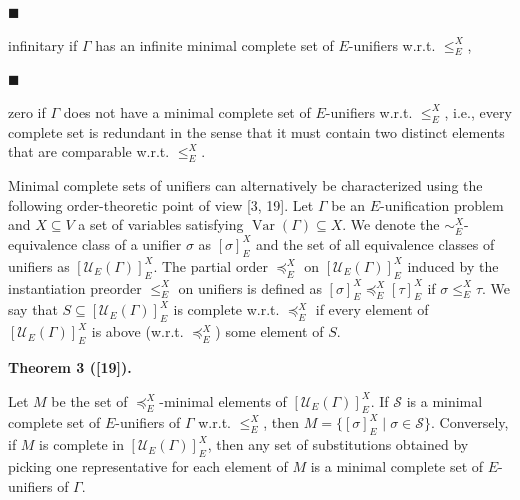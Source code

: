  
\par\noindent  $\blacksquare$ 
 
infinitary if $\Gamma$ has an infinite minimal complete set of $E$-unifiers w.r.t. $\leq_{E}^{X}$,\par
 
 
 
\par\noindent  $\blacksquare$ 
 
zero if $\Gamma$ does not have a minimal complete set of $E$-unifiers w.r.t. $\leq_{E}^{X}$, i.e., every complete set is redundant in the sense that it must contain two distinct elements that are comparable w.r.t. $\leq_{E}^{X}$.\par
 
 
  
 
 
 
Minimal complete sets of unifiers can alternatively be characterized using the following order-theoretic point of view [3, 19]. Let $\Gamma$ be an $E$-unification problem and $X\subseteq V$ a set of variables satisfying $\operatorname{Var}(\Gamma)\subseteq X$. We denote the $\sim_{E}^{X}$-equivalence class of a unifier $\sigma$ as $[\sigma]_{E}^{X}$ and the set of all equivalence classes of unifiers as $[\mathcal{U}_{E}(\Gamma)]_{E}^{X}$. The partial order $\preceq_{E}^{X}$ on $[\mathcal{U}_{E}(\Gamma)]_{E}^{X}$ induced by the instantiation preorder $\leq_{E}^{X}$ on unifiers is defined as $[\sigma]_{E}^{X}\preceq_{E}^{X}[\tau]_{E}^{X}$ if $\sigma\leq_{E}^{X}\tau$. We say that $S\subseteq[\mathcal{U}_{E}(\Gamma)]_{E}^{X}$ is complete w.r.t. $\preceq_{E}^{X}$ if every element of $[\mathcal{U}_{E}(\Gamma)]_{E}^{X}$ is above (w.r.t. $\preceq_{E}^{X}$) some element of $S$.\par
 
 
 
\par\medskip\noindent\textbf{Theorem 3 ([19]).}\par
 
 
Let $M$ be the set of $\preceq_{E}^{X}$-minimal elements of $[\mathcal{U}_{E}(\Gamma)]_{E}^{X}$. If $\mathcal{S}$ is a minimal complete set of $E$-unifiers of $\Gamma$ w.r.t. $\leq_{E}^{X}$, then $M=\{[\sigma]_{E}^{X}\mid\sigma\in\mathcal{S}\}$. Conversely, if $M$ is complete in $[\mathcal{U}_{E}(\Gamma)]_{E}^{X}$, then any set of substitutions obtained by picking one representative for each element of $M$ is a minimal complete set of $E$-unifiers of $\Gamma$.\par
 
